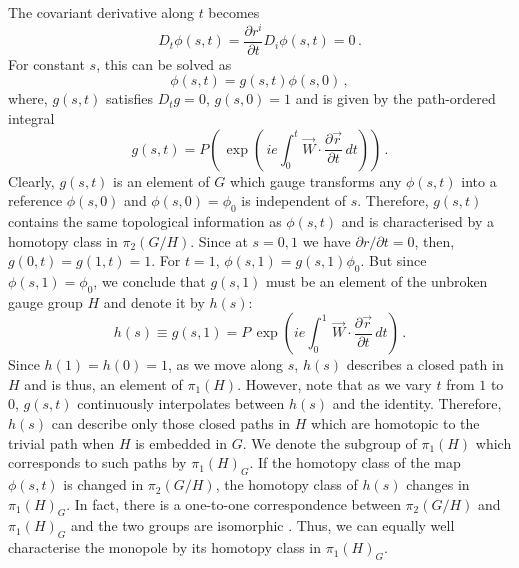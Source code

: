 The covariant derivative along $t$ becomes
$$
D_t \phi(s,t) =\frac{\partial r^i}{\partial t}D_i \phi(s,t)=0\,.
$$
For constant $s$, this can be solved as 
$$
\phi(s,t)=g(s,t)\phi(s,0)\,, 
$$
where, $g(s,t)$ satisfies $D_t g=0$, $g(s,0)=1$ and is given by the
path-ordered integral 
\begin{equation}
g (s,t) =  P\left(\,\exp \left(\,ie\int^{t}_{0}
\vec{W}\cdot\frac{\partial \vec{r}}{\partial t} \, dt\right)\right)\,. 
\label{LVIII}
\end{equation}
Clearly, $g(s,t)$ is an element of $G$ which gauge transforms any
$\phi(s,t)$ into a reference $\phi(s,0)$ and  $\phi(s,0)=\phi_0$ is
independent of $s$. Therefore, $g(s,t)$ contains the same topological
information as $\phi(s,t)$ and is characterised by a homotopy class
in $\pi_2(G/H)$. Since at $s=0,1$ we have $\partial r/ \partial t =0$,
then, $g(0,t)=g(1,t)=1$. For $t=1$, $\phi(s,1)=g(s,1)\phi_0$. But
since $\phi(s,1)=\phi_0$, we conclude that $g(s,1)$ must be an element
of the unbroken gauge group $H$ and denote it by $h(s)$:
\begin{equation}
h(s)\equiv g(s,1)=P\,\exp\left(ie\int^1_0\,\vec{W}\cdot\frac{\partial
\vec{r}}{\partial t}\,dt\right)\,. 
\label{LIX}
\end{equation}
Since $h(1)=h(0)=1$, as we move along $s$, $h(s)$ describes a closed
path in $H$ and is thus, an element of $\pi_1(H)$. However, note that
as we vary $t$ from $1$ to $0$, $g(s,t)$ continuously interpolates
between $h(s)$ and the identity. Therefore, $h(s)$ can describe only
those closed paths in $H$ which are homotopic to the trivial path when
$H$ is embedded in $G$. We denote the subgroup of $\pi_1(H)$ which 
corresponds to such paths by $\pi_1(H)_G$. If the homotopy class of
the map $\phi(s,t)$ is changed in $\pi_2(G/H)$, the homotopy class of
$h(s)$ changes in $\pi_1(H)_G$. In fact, there is a one-to-one
correspondence between $\pi_2(G/H)$ and $\pi_1(H)_G$ and the two
groups are isomorphic \cite{coleman1}. Thus, we can equally well
characterise the monopole by its homotopy class in $\pi_1(H)_G$.   

